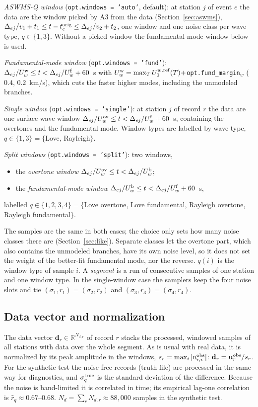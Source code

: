 \documentclass[11pt]{article}
\begin{document}
\emph{ASWMS-Q window} (\texttt{opt.windows = 'auto'}, default): at station
$j$ of event $e$ the data are the window picked by A3 from the data
(Section~\ref{sec:aswms}), $\Delta_{ej}/v_1+t_1\le t-t^{\rm orig}_e\le\Delta_{ej}/v_2+t_2$,
one window and one noise class per wave type, $q\in\{1,3\}$. Without a
picked window the fundamental-mode window below is used.

\emph{Fundamental-mode window} (\texttt{opt.windows = 'fund'}):
$\Delta_{ej}/U^{\rm w}_w\le t<\Delta_{ej}/U^{\rm f}_w+60$~s with
$U^{\rm w}_w=\max_TU^{w,\rm ref}_0(T)+$\texttt{opt.fund\_margin}$_w$
($0.4$, $0.2$~km/s), which cuts the faster higher modes, including the
unmodeled branches.

\emph{Single window} (\texttt{opt.windows = 'single'}): at station
$j$ of record $r$ the data are one surface-wave window
$\Delta_{ej}/U^{\rm ov}_w\le t<\Delta_{ej}/U^{\rm f}_w+60$~s, containing the
overtones and the fundamental mode. Window types are labelled by wave
type, $q\in\{1,3\}=\{$Love, Rayleigh$\}$.

\emph{Split windows} (\texttt{opt.windows = 'split'}): two windows,
\begin{itemize}
\item the \emph{overtone window} $\Delta_{ej}/U^{\rm ov}_w\le t<\Delta_{ej}/U^{\rm b}_w$;
\item the \emph{fundamental-mode window} $\Delta_{ej}/U^{\rm b}_w\le t<\Delta_{ej}/U^{\rm f}_w+60$~s,
\end{itemize}
labelled $q\in\{1,2,3,4\}=\{$Love overtone, Love fundamental, Rayleigh
overtone, Rayleigh fundamental$\}$.

The samples are the same in both cases; the choice only sets how many
noise classes there are (Section~\ref{sec:like}). Separate classes let the
overtone part, which also contains the unmodeled branches, have its own
noise level, so it does not set the weight of the better-fit fundamental
mode, nor the reverse. $q(i)$ is the window type of sample $i$. A
\emph{segment} is a run of consecutive samples of one station and one
window type. In the single-window case the samplers keep the four noise
slots and tie $(\sigma_1,r_1)=(\sigma_2,r_2)$ and $(\sigma_3,r_3)=(\sigma_4,r_4)$.

\subsection{Data vector and normalization}
The data vector $\mathbf{d}_r\in\mathbb{R}^{N_{d,r}}$ of record $r$ stacks
the processed, windowed samples of all stations with data over the whole
segment. As is usual with real data, it is normalized by its peak
amplitude in the windows, $s_r=\max_i|u^{\rm obs}_{r,i}|$:
$\mathbf{d}_r=\mathbf{u}^{\rm obs}_r/s_r$. For the synthetic test the
noise-free records (truth file) are processed in the same way for
diagnostics, and $\sigma^{\rm true}_q$ is the standard deviation of the
difference. Because the noise is band-limited it is correlated in time;
its empirical lag-one correlation is $\hat r_q\approx0.67$--$0.68$.
$N_d=\sum_rN_{d,r}\approx88{,}000$ samples in the synthetic test.
\end{document}

